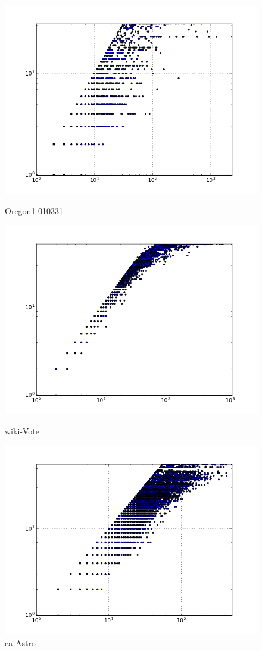 \begin{figure}[H]
  \includegraphics[width=\linewidth]{img/oregon-010331/degreeVSkcore.png}
  \caption*{Oregon1-010331}
\endminipage\hfill
{}
  \includegraphics[width=\linewidth]{img/wiki-Vote/degreeVSkcore.png}
  \caption*{wiki-Vote}
\endminipage\hfill
{}
  \includegraphics[width=\linewidth]{img/ca-Astro/degreeVSkcore.png}
  \caption*{ca-Astro}
\endminipage
\end{figure}
